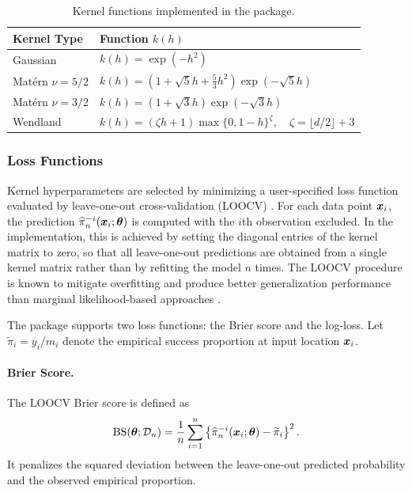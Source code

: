 \documentclass[article, shortnames]{jss}
\renewcommand{\vec}[1]{\mbox{\boldmath ${#1}$}}
\begin{document}
\begin{table}[!t]
	\renewcommand{\arraystretch}{1.5}
	\centering
	\begin{tabular}{ll}
		\toprule
		\textbf{Kernel Type} & \textbf{Function $k(h)$}\\
		\midrule
		Gaussian & $k(h) = \exp(-h^2)$ \\
		Mat\'{e}rn $\nu = 5/2$ & $k(h) = \left(1 + \sqrt{5}h + \frac{5}{3}h^2 \right)\exp(-\sqrt{5}h)$ \\
		Mat\'{e}rn $\nu = 3/2$ & $k(h) = \left(1 + \sqrt{3}h\right)\exp(-\sqrt{3}h)$ \\
		Wendland & $k(h)=\left(\zeta h+1\right)\max\{0,1-h\}^\zeta,\quad \zeta=\lfloor d/2\rfloor+3$ \\
		\bottomrule
	\end{tabular}
	\caption{Kernel functions implemented in the  package.}
	\label{tab:kernel-functions}
\end{table}

\subsubsection{Loss Functions}

Kernel hyperparameters are selected by minimizing a user-specified loss function evaluated by leave-one-out cross-validation (LOOCV) \citep{Montesano2012}. 
For each data point $\vec{x}_i$, the prediction $\widehat{\pi}_n^{-i}(\vec{x}_i;\vec{\theta})$ is computed with the $i$th observation excluded. 
In the implementation, this is achieved by setting the diagonal entries of the kernel matrix to zero, so that all leave-one-out predictions are obtained from a single kernel matrix rather than by refitting the model $n$ times. 
The LOOCV procedure is known to mitigate overfitting and produce better generalization performance than marginal likelihood-based approaches \citep{Rasmussen2006GPML, Vehtari2017LOOCV}.

The  package supports two loss functions: the Brier score and the log-loss. 
Let $\widetilde{\pi}_i = y_i/m_i$ denote the empirical success proportion at input location $\vec{x}_i$.

\paragraph{Brier Score.}
The LOOCV Brier score is defined as
\begin{equation}\label{eq:Brier}
	\mathrm{BS}(\vec{\theta}; \mathcal{D}_n) = \frac{1}{n} \sum_{i=1}^{n} \left\{ \widehat{\pi}_n^{-i}(\vec{x}_i;\vec{\theta}) - \widetilde{\pi}_i \right\}^2.
\end{equation}
It penalizes the squared deviation between the leave-one-out predicted probability and the observed empirical proportion.
\end{document}
